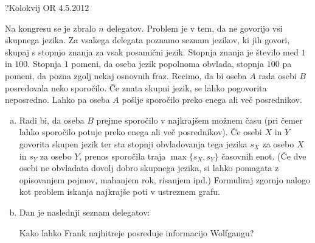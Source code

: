 \begin{naloga}{?}{Kolokvij OR 4.5.2012}
\begin{vprasanje}
Na kongresu se je zbralo $n$ delegatov.
Problem je v tem, da ne govorijo vsi skup\-ne\-ga jezika.
Za vsakega delegata poznamo seznam jezikov, ki jih govori,
skupaj s stopnjo znanja za vsak posamični jezik.
Stopnja znanja je število med $1$ in $100$.
Stopnja $1$ pomeni, da oseba jezik popolnoma obvlada,
stopnja $100$ pa pomeni, da pozna zgolj nekaj osnovnih fraz.
Recimo, da bi oseba $A$ rada osebi $B$ posredovala neko sporočilo.
Če znata skupni jezik, se lahko pogovorita neposredno.
Lahko pa oseba $A$ pošlje sporočilo preko enega ali več posrednikov.

\begin{enumerate}[(a)]
\item Radi bi, da oseba $B$ prejme sporočilo v najkrajšem možnem času
(pri čemer lahko sporočilo potuje preko enega ali več posrednikov).
Če osebi $X$ in $Y$ govorita skupen jezik
ter sta stopnji obvladovanja tega jezika
$s_X$ za osebo $X$ in $s_Y$ za osebo $Y$,
prenos sporočila traja $\max\{s_X, s_Y\}$ časovnih enot.
(Če dve osebi ne obvladata dovolj dobro skupnega jezika,
si lahko pomagata z opisovanjem pojmov, mahanjem rok, risanjem ipd.)
Formuliraj zgornjo nalogo
kot problem iskanja najkrajše poti v ustreznem grafu.

\item Dan je naslednji seznam delegatov:

\smallskip
{}

\bigskip
Kako lahko Frank najhitreje posreduje informacijo Wolfgangu?
\end{enumerate}
\end{vprasanje}
\begin{odgovor}
\end{odgovor}
\end{naloga}
